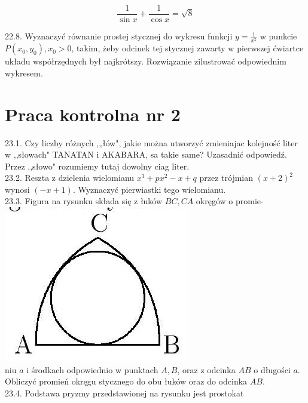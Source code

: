 \documentclass[10pt]{article}
\begin{document}
$$
\frac{1}{\sin x}+\frac{1}{\cos x}=\sqrt{8}
$$

22.8. Wyznaczyć równanie prostej stycznej do wykresu funkcji $y=\frac{1}{x^{2}}$ w punkcie $P\left(x_{0}, y_{0}\right), x_{0}>0$, takim, żeby odcinek tej stycznej zawarty w pierwszej ćwiartce układu współrzędnych był najkrótszy. Rozwiązanie zilustrować odpowiednim wykresem.

\section*{Praca kontrolna nr 2}
23.1. Czy liczby różnych ,„łów", jakie można utworzyć zmieniajac kolejność liter w ,,słowach" TANATAN i AKABARA, sa takie same? Uzasadnić odpowiedź. Przez ,,słowo" rozumiemy tutaj dowolny ciag liter.\\
23.2. Reszta z dzielenia wielomianu $x^{3}+p x^{2}-x+q$ przez trójmian $(x+2)^{2}$ wynosi $(-x+1)$. Wyznaczyć pierwiastki tego wielomianu.\\
23.3. Figura na rysunku składa się z łuków $B C, C A$ okręgów o promie-\\
\includegraphics[max width=\textwidth, center]{2024_11_16_fe5b564401bf7db98894g-031(1)}\\
niu $a$ i środkach odpowiednio w punktach $A, B$, oraz z odcinka $A B$ o długości $a$. Obliczyć promień okręgu stycznego do obu łuków oraz do odcinka $A B$.\\
23.4. Podstawa pryzmy przedstawionej na rysunku jest prostokat\\
\end{document}
